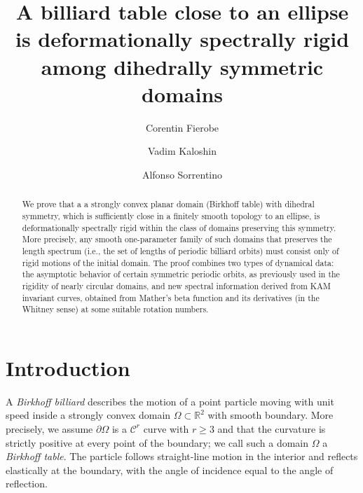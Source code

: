 \documentclass[12pt, openany]{amsart}
\theoremstyle{definition}
\theoremstyle{remark}
\theoremstyle{remark}
\theoremstyle{theorem}
\theoremstyle{theorem}
\theoremstyle{theorem}
\theoremstyle{theorem}
\begin{document}
\title[]{A billiard table close to an ellipse is deformationally spectrally rigid among dihedrally symmetric domains}

\author{Corentin Fierobe}
\address{Department of Mathematics, University of Rome Tor Vergata, Via della Ricerca Scientifica 1, 00133 Rome, Italy}

\author{Vadim Kaloshin}
\address{Institute of Science and Technology Austria, Am Campus 1, 3400 Klosterneuburg, Austria}

\author{Alfonso Sorrentino}
\address{Department of Mathematics, University of Rome Tor Vergata, Via della Ricerca Scientifica 1, 00133 Rome, Italy}

\begin{abstract} 
We prove that a a strongly convex planar domain (Birkhoff table) with dihedral symmetry, which is sufficiently close in a finitely smooth  topology to an ellipse, is deformationally spectrally rigid within the class of domains preserving this symmetry. More precisely, any smooth one-parameter family of such domains that preserves the length spectrum (i.e., the set of lengths of periodic billiard orbits) must consist only of rigid motions of the initial domain. The proof combines two types of dynamical data: the asymptotic behavior of certain symmetric periodic orbits, as previously used in the rigidity of nearly circular domains, and new spectral information derived from KAM invariant curves, obtained from Mather's beta function and its derivatives (in the Whitney sense) at some suitable rotation numbers.
\end{abstract}

\maketitle








\section{Introduction} 


A \emph{Birkhoff billiard} describes the motion of a point particle moving with unit speed inside a strongly convex domain $\Omega \subset \mathbb{R}^2$ with smooth boundary. More precisely, we assume $\partial \Omega$ is a $\mathscr{C}^r$ curve with $r \geq 3$ and that the curvature is strictly positive at every point of the boundary; we call such a domain $\Omega$ a \emph{Birkhoff table}. The particle follows straight-line motion in the interior and reflects elastically at the boundary, with the angle of incidence equal to the angle of reflection.
\end{document}
